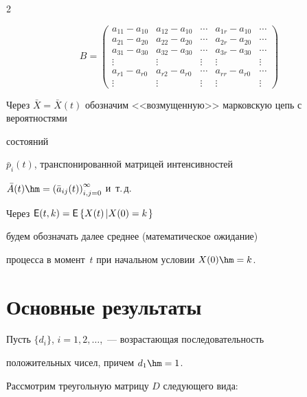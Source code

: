 \begin{multicols}{2}
{\begin{equation}
B = \begin{pmatrix}

a_{11}- a_{10}   & a_{12} - a_{10}   &  \cdots & a_{1r} - a_{10}  &\cdots \\

a_{21} - a_{20} & a_{22} - a_{20}   &    \cdots & a_{2r} - a_{20} &\cdots \\

a_{31} - a_{30}    & a_{32} - a_{30}  &    \cdots & a_{3r} - a_{30}  &\cdots \\

\vdots &\vdots &\vdots &\vdots &\vdots\\

a_{r1} - a_{r0}  & a_{r2} - a_{r0} & \cdots     &  a_{rr} -a_{r0} &\cdots \\

\vdots &\vdots &\vdots &\vdots &\vdots

\end{pmatrix}

\label{2.07}

\end{equation}

}

Через  $\bar{X}=\bar{X}(t)$ обозначим <<возмущенную>> марковскую цепь с вероятностями

со\-сто\-яний

$\bar{p}_i(t)$, транспонированной матрицей интенсивностей

$\bar{A}(t) \hm= \left(\bar{a}_{ij}(t)\right)_{i,j=0}^{\infty}$ и~т.\,д.



Через  ${\sf E}(t,k) = {\sf E}\left\{X(t)\left|X(0)=k\right.\right\}$

будем обозначать далее среднее (математическое ожидание)

процесса в момент~$t$ при начальном условии $X(0)\hm=k$.



\section{Основные результаты}



Пусть $\{d_i\}$, $i=1,2, \dots$,~--- возрастающая последовательность

положительных чисел, причем $d_1\hm = 1$.



Рассмотрим треугольную матрицу $D$ следующего вида:


\end{multicols}
